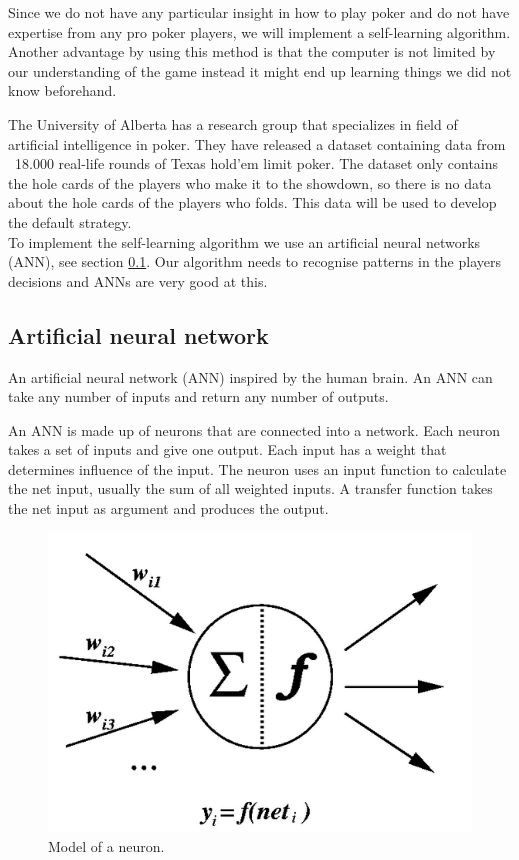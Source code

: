 Since we do not have any particular insight in how to play poker and do not have expertise from any pro poker players, we will implement a self-learning algorithm. Another advantage by using this method is that the computer is not limited by our understanding of the game instead it might end up learning things we did not know beforehand.

The University of Alberta has a research group that specializes in field of artificial intelligence in poker. They have released a dataset containing data from ~18.000 real-life rounds of Texas hold'em limit poker. The dataset only contains the hole cards of the players who make it to the showdown, so there is no data about the hole cards of the players who folds. This data will be used to develop the default strategy.\\

To implement the self-learning algorithm we use an artificial neural networks (ANN), see section \ref{sec:nn}. Our algorithm needs to recognise patterns in the players decisions and ANNs are very good at this. 

\subsection{Artificial neural network}
\label{sec:nn}
An artificial neural network (ANN) inspired by the human brain. An ANN can take any number of inputs and return any number of outputs. 

An ANN is made up of neurons that are connected into a network. Each neuron takes a set of inputs and give one output. Each input has a weight that determines influence of the input. The neuron uses an input function to calculate the net input, usually the sum of all weighted inputs. A transfer function takes the net input as argument and produces the output.

\begin{figure}[H]
  \center
    \includegraphics[scale=0.5]{images/nn/neuron.png}
  \caption{Model of a neuron. \label{fig:neuron}}
\end{figure}

